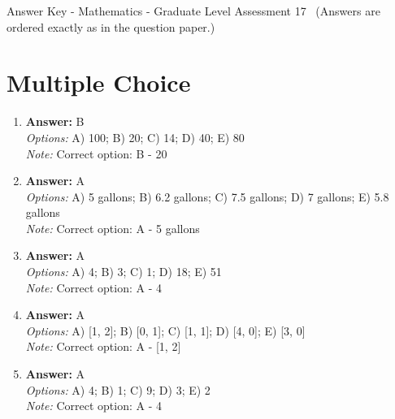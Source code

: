 \documentclass[12pt]{article}
\begin{document}
\begin{center}
Answer Key - Mathematics - Graduate Level Assessment 17 \
\small (Answers are ordered exactly as in the question paper.)
\end{center}

\section*{Multiple Choice}
\begin{enumerate}[label=\arabic*.]
\item \textbf{Answer:} B
\\ \textit{Options:} A) 100; B) 20; C) 14; D) 40; E) 80
\\ \textit{Note:} Correct option: B - 20
\item \textbf{Answer:} A
\\ \textit{Options:} A) 5 gallons; B) 6.2 gallons; C) 7.5 gallons; D) 7 gallons; E) 5.8 gallons
\\ \textit{Note:} Correct option: A - 5 gallons
\item \textbf{Answer:} A
\\ \textit{Options:} A) 4; B) 3; C) 1; D) 18; E) 51
\\ \textit{Note:} Correct option: A - 4
\item \textbf{Answer:} A
\\ \textit{Options:} A) [1, 2]; B) [0, 1]; C) [1, 1]; D) [4, 0]; E) [3, 0]
\\ \textit{Note:} Correct option: A - [1, 2]
\item \textbf{Answer:} A
\\ \textit{Options:} A) 4; B) 1; C) 9; D) 3; E) 2
\\ \textit{Note:} Correct option: A - 4
\end{enumerate}
\end{document}
